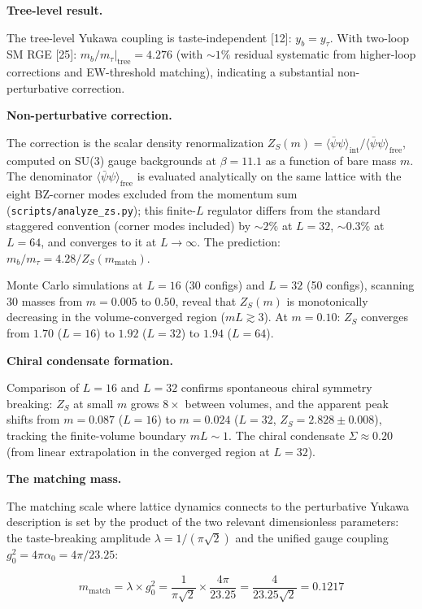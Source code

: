 \documentclass[
]{article}
\begin{document}
\textbf{Tree-level result.}

The tree-level Yukawa coupling is taste-independent {[}12{]}:
\(y_b = y_\tau\). With two-loop SM RGE {[}25{]}:
\(m_b/m_\tau|_{\text{tree}} = 4.276\) (with \(\sim 1\%\) residual
systematic from higher-loop corrections and EW-threshold matching),
indicating a substantial non-perturbative correction.

\textbf{Non-perturbative correction.}

The correction is the scalar density renormalization
\(Z_S(m) = \langle\bar\psi\psi\rangle_{\text{int}} / \langle\bar\psi\psi\rangle_{\text{free}}\),
computed on SU(3) gauge backgrounds at \(\beta = 11.1\) as a function of
bare mass \(m\). The denominator
\(\langle\bar\psi\psi\rangle_{\text{free}}\) is evaluated analytically
on the same lattice with the eight BZ-corner modes excluded from the
momentum sum (\texttt{scripts/analyze\_zs.py}); this finite-\(L\)
regulator differs from the standard staggered convention (corner modes
included) by \(\sim 2\%\) at \(L = 32\), \(\sim 0.3\%\) at \(L = 64\),
and converges to it at \(L \to \infty\). The prediction:
\(m_b/m_\tau = 4.28/Z_S(m_{\text{match}})\).

Monte Carlo simulations at \(L = 16\) (30 configs) and \(L = 32\) (50
configs), scanning 30 masses from \(m = 0.005\) to \(0.50\), reveal that
\(Z_S(m)\) is monotonically decreasing in the volume-converged region
(\(mL \gtrsim 3\)). At \(m = 0.10\): \(Z_S\) converges from \(1.70\)
(\(L{=}16\)) to \(1.92\) (\(L{=}32\)) to \(1.94\) (\(L{=}64\)).

\textbf{Chiral condensate formation.}

Comparison of \(L = 16\) and \(L = 32\) confirms spontaneous chiral
symmetry breaking: \(Z_S\) at small \(m\) grows \(8\times\) between
volumes, and the apparent peak shifts from \(m = 0.087\) (\(L{=}16\)) to
\(m = 0.024\) (\(L{=}32\), \(Z_S = 2.828 \pm 0.008\)), tracking the
finite-volume boundary \(mL \sim 1\). The chiral condensate
\(\Sigma \approx 0.20\) (from linear extrapolation in the converged
region at \(L = 32\)).

\textbf{The matching mass.}

The matching scale where lattice dynamics connects to the perturbative
Yukawa description is set by the product of the two relevant
dimensionless parameters: the taste-breaking amplitude
\(\lambda = 1/(\pi\sqrt{2})\) and the unified gauge coupling
\(g_0^2 = 4\pi\alpha_0 = 4\pi/23.25\):

\[m_{\text{match}} = \lambda \times g_0^2 = \frac{1}{\pi\sqrt{2}} \times \frac{4\pi}{23.25} = \frac{4}{23.25\sqrt{2}} = 0.1217\]
\end{document}
